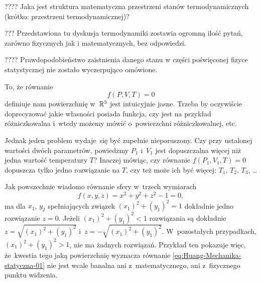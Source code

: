 \documentclass[a4paper,11pt]{article}
\numberwithin{equation}{section}
\begin{document}
\VerSpaceFour





\noindent
???? Jaka jest struktura matematyczna przestrzeni stanów termodynamicznych
(krótko: przestrzeni termodynamicznej)?

\VerSpaceFour





\noindent
??? Przedstawiona tu dyskusja termodynamiki zostawia ogromną ilość pytań,
zarówno fizycznych jak i matematycznych, bez odpowiedzi.

\VerSpaceFour





\noindent
???? Prawdopodobieństwo zaistnienia danego stanu w części poświęconej fizyce
statystycznej nie zostało wyczerpująco omówione.







\noindent
{} To, że równanie
\begin{equation}
  \label{eq:Huang-Mechanika-statystyczna-01}
  f( P, V, T ) = 0
\end{equation}
definiuje nam powierzchnię w~$\mathbb{R}^{ 3 }$ jest intuicyjnie jasne. Trzeba by
oczywiście doprecyzować jakie własności posiada funkcja, czy jest na
przykład różniczkowalna i~wtedy możemy mówić o~powierzchni różniczkowalnej,
etc.

Jednak jeden problem wydaje~się być zupełnie nieporuszony. Czy przy
ustalonej wartości dwóch parametrów, powiedzmy $P_{ 1 }$ i~$V_{ 1 }$ jest
dopuszczalna więcej niż jedna wartość temperatury $T$? Inaczej mówiąc, czy
równanie $f( P_{ 1 }, V_{ 1 }, T ) = 0$ dopuszcza tylko jedno rozwiązanie na
$T$, czy też może ich być więcej: $T_{ 1 }$, $T_{ 2 }$, $T_{ 3 }$, \ldots

Jak powszechnie wiadomo równanie sfery w~trzech wymiarach
\begin{equation}
  \label{eq:Huang-Mechanika-statyczna-02}
  f( x, y, z ) = x^{ 2 } + y^{ 2 } + z^{ 2 } - 1 = 0,
\end{equation}
ma dla $x_{ 1 }$, $y_{ 2 }$ spełniających związek
$( x_{ 1 } )^{ 2 } + ( y_{ 1 } )^{ 2 } = 1$ dokładnie jedno rozwiązanie
$z = 0$. Jeżeli $( x_{ 1 } )^{ 2 } + ( y_{ 1 } )^{ 2 } < 1$ rozwiązania są
dokładnie $z = \sqrt{ ( x_{ 1 } )^{ 2 } + ( y_{ 1 } )^{ 2 } }$
i~$z = -\sqrt{ ( x_{ 1 } )^{ 2 } + ( y_{ 1 } )^{ 2 } }$. W~pozostałych
przypadkach, $( x_{ 1 } )^{ 2 } + ( y_{ 1 } )^{ 2 } > 1$, nie ma żadnych
rozwiązań. Przykład ten pokazuje więc, że~kwestia tego jaką powierzchnię
wyznacza równanie \eqref{eq:Huang-Mechanika-statyczna-01} nie jest wcale
banalna ani z~matematycznego, ani z~fizycznego punktu widzenia.
\end{document}
